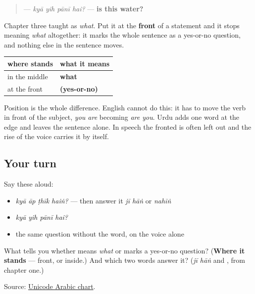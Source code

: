 \begin{quote}
\textbf{   } — \emph{kyā yih pānī hai?} — \textbf{is this water?}
\end{quote}

Chapter three taught \textbf{} as \emph{what}. Put it at the \textbf{front} of a statement and it stops meaning \emph{what} altogether: it marks the whole sentence as a yes-or-no question, and nothing else in the sentence moves.

\begin{grammarlens}[title={Grammar Lens: one word, two jobs, told apart by position}]
\noindent
\begin{tabularx}{\linewidth}{@{}>{\raggedright\arraybackslash}X>{\raggedright\arraybackslash}X@{}}
\toprule
\textbf{where \ur{کیا} stands} & \textbf{what it means} \\
\midrule
in the middle & \textbf{what} \\
at the front & \textbf{(yes-or-no)} \\
\bottomrule
\end{tabularx}

Position is the whole difference. English cannot do this: it has to move the verb in front of the subject, \emph{you are} becoming \emph{are you}. Urdu adds one word at the edge and leaves the sentence alone. In speech the fronted \textbf{} is often left out and the rise of the voice carries it by itself.
\end{grammarlens}

\subsection*{Your turn}
Say these aloud:

\begin{itemize}
\raggedright
  \item \emph{kyā āp ṭhīk haiṅ?} — then answer it \emph{jī hāṅ} or \emph{nahīṅ}
  \item \emph{kyā yih pānī hai?}
  \item the same question without the word, on the voice alone
\end{itemize}

\begin{tcolorbox}[breakable,colback=teal!4,colframe=teal!35!black,title={Before you move on}]
What tells you whether \textbf{} means \emph{what} or marks a yes-or-no question? (\textbf{Where it stands} — front, or inside.) And which two words answer it? (\emph{jī hāṅ} and \textbf{}, from chapter one.)

Source: \href{https://www.unicode.org/charts/PDF/U0600.pdf}{Unicode Arabic chart}.
\end{tcolorbox}
